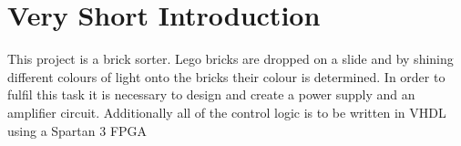\section{Very Short Introduction}
This project is a brick sorter. Lego bricks are dropped on a slide and by shining different colours of light onto the bricks their colour is determined. In order to fulfil this task it is necessary to design and create a power supply and an amplifier circuit. Additionally all of the control logic is to be written in VHDL using a Spartan 3 FPGA